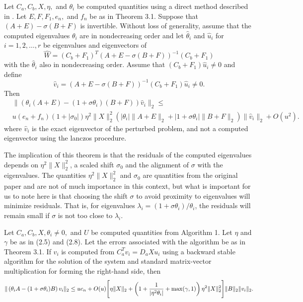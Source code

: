 \begin{theorem}\label{thrm:ResidualBoundsEigenvalues}
	Let $C_a, C_b, X, \eta,$ and $\theta_i$ be computed quantities using a direct method described in \cite{stewart2024spectraltransformationdensesymmetric}. Let $E, F, F_1, e_n,$ and $f_n$ be as in Theorem 3.1. Suppose that $(A + E) - \sigma(B + F)$ is invertible. Without loss of generality, assume that the computed eigenvalues $\theta_i$ are in nondecreasing order and let $\hat{\theta}_i$ and $\hat{u}_i$ for $i = 1, 2, \dots, r$ be eigenvalues and eigenvectors of
	\[
	\hat{W} = (C_b + F_1)^{T} (A + E - \sigma(B + F))^{-1}(C_b + F_1)
	\]
	with the $\hat{\theta}_i$ also in nondecreasing order. Assume that $(C_b + F_1) \hat{u}_i \neq 0$ and define
	\[
	\hat{v}_i = (A + E - \sigma(B + F))^{-1} (C_b + F_1) \hat{u}_i \neq 0.
	\]
	 Then
	\begin{align*}
		&\|(\theta_i (A + E) - (1 + \sigma \theta_i) (B + F)) \hat{v}_i \|_2
		\leq \\
		& u (e_n + f_n)(1 + | \sigma_0 |) \eta^2 \| X \|_2^2 \left( | \theta_i | \| A + E \|_2 + | 1 + \sigma \theta_i | \| B + F \|_2 \right) \| \hat{v}_i \|_2 + O(u^2).
	\end{align*}
where $\hat{v}_i$ is the exact eigenvector of the perturbed problem, and not a computed eigenvector using the lanczos procedure.
\end{theorem}
The implication of this theorem is that the residuals of the computed eigenvalues depends on $\eta^2 \| X \|_2^2$, a scaled shift $\sigma_0$ and the alignment of $\sigma$ with the eigenvalues. The quantities $\eta^2 \| X \|_2^2$ and  $\sigma_0$  are quantities from the original paper and are not of much importance in this context, but what is important for us to note here is that choosing the shift $\sigma$ to avoid proximity to eigenvalues will minimize residuals. That is, for eigenvalues $\lambda_i = (1 + \sigma \theta_i)/ \theta_i$, the residuals will remain small if $\sigma$ is not too close to $\lambda_i$.

\begin{lemma}\label{lemma:ResidualBoundsEigenvectors}
		Let $C_a, C_b, X, \theta_i \neq 0,$ and $U$ be computed quantities from Algorithm 1. Let $\eta$ and $\gamma$ be as in (2.5) and (2.8). Let the errors associated with the algorithm be as in Theorem 3.1. If $v_i$ is computed from $C_a^T v_i = D_a X u_i$ using a backward stable algorithm for the solution of the system and standard matrix-vector multiplication for forming the right-hand side, then
		\[
		\| \left( \theta_i A - (1 + \sigma \theta_i) B \right) v_i \|_2 \leq u c_n + O(u) \Bigg[ \eta \| X \|_2 \\
		+ \left( 1 + \frac{1}{| \eta^2 \theta_i |} + \max(\gamma, 1) \right) \eta^2 \| X \|_2^2 \Bigg] \| B \|_2 \| v_i \|_2.\]
\end{lemma}

